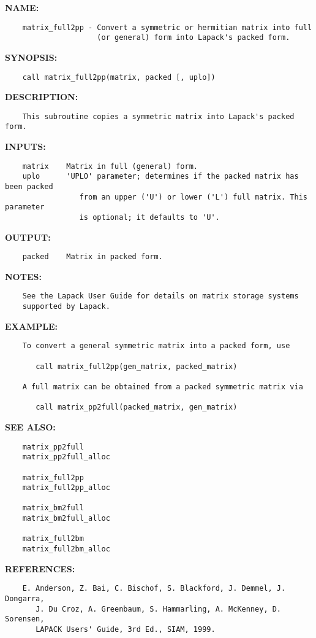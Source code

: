 \label{ch:robo20}
\label{ch:Matrices_matrix_full2pp}
\textbf{NAME:}\hspace{0.08in}\begin{Verbatim}
    matrix_full2pp - Convert a symmetric or hermitian matrix into full
                     (or general) form into Lapack's packed form.
\end{Verbatim}
\textbf{SYNOPSIS:}\hspace{0.08in}\begin{Verbatim}
    call matrix_full2pp(matrix, packed [, uplo])
\end{Verbatim}
\textbf{DESCRIPTION:}\hspace{0.08in}\begin{Verbatim}
    This subroutine copies a symmetric matrix into Lapack's packed form.
\end{Verbatim}
\textbf{INPUTS:}\hspace{0.08in}\begin{Verbatim}
    matrix    Matrix in full (general) form.
    uplo      'UPLO' parameter; determines if the packed matrix has been packed
                 from an upper ('U') or lower ('L') full matrix. This parameter
                 is optional; it defaults to 'U'.
\end{Verbatim}
\textbf{OUTPUT:}\hspace{0.08in}\begin{Verbatim}
    packed    Matrix in packed form.
\end{Verbatim}
\textbf{NOTES:}\hspace{0.08in}\begin{Verbatim}
    See the Lapack User Guide for details on matrix storage systems
    supported by Lapack. 
\end{Verbatim}
\textbf{EXAMPLE:}\hspace{0.08in}\begin{Verbatim}
    To convert a general symmetric matrix into a packed form, use

       call matrix_full2pp(gen_matrix, packed_matrix)

    A full matrix can be obtained from a packed symmetric matrix via

       call matrix_pp2full(packed_matrix, gen_matrix)
\end{Verbatim}
\textbf{SEE ALSO:}\hspace{0.08in}\begin{Verbatim}
    matrix_pp2full
    matrix_pp2full_alloc

    matrix_full2pp
    matrix_full2pp_alloc

    matrix_bm2full
    matrix_bm2full_alloc

    matrix_full2bm
    matrix_full2bm_alloc
\end{Verbatim}
\textbf{REFERENCES:}\hspace{0.08in}\begin{Verbatim}
    E. Anderson, Z. Bai, C. Bischof, S. Blackford, J. Demmel, J. Dongarra,
       J. Du Croz, A. Greenbaum, S. Hammarling, A. McKenney, D. Sorensen,
       LAPACK Users' Guide, 3rd Ed., SIAM, 1999.
\end{Verbatim}
